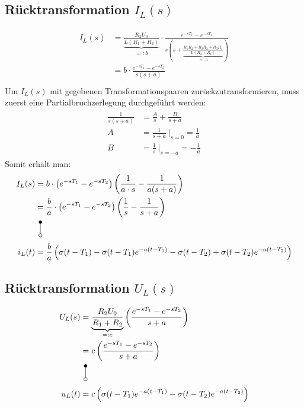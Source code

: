 \documentclass[11pt]{scrartcl}
\begin{document}
\subsection{Rücktransformation $I_{L}(s)$}
\begin{align}
  \begin{split}
    I_{L}(s) &= \underbrace{\frac{R_{2}U_{0}}{L(R_{1} + R_{2})}}_{=:b} \cdot \frac{e^{-sT_{1}} - e^{-sT_{2}}}{s\left( s + \underbrace{\frac{R_{1}R_{2} + R_{3}R_{2} + R_{3}R_{1}}{L(R_{2} + R_{1})}}_{=:a}\right)} \\
    &= b \cdot \frac{e^{-sT_{1}} - e^{-sT_{2}}}{s\left( s + a\right)} \\
  \end{split}
\end{align}
Um $I_{L}(s)$ mit gegebenen Transformationspaaren zurückzutransformieren, muss zuerst eine Partialbruchzerlegung durchgeführt werden:
\begin{align}
  \begin{split}
    \frac{1}{s(s+a)} &= \frac{A}{s} + \frac{B}{s+a} \\[20pt]
    A &= \frac{1}{s+a}\ \Bigg|_{s=0} = \frac{1}{a} \\
    B &= \frac{1}{s}\ \Bigg|_{s=-a} = -\frac{1}{a}
  \end{split}
\end{align}
Somit erhält man:
\begin{align}
  \begin{split}
    I_{L}(s) &= b \cdot \left(e^{-sT_{1}} - e^{-sT_{2}}\right) \left( \frac{1}{a\cdot s} - \frac{1}{a(s+a)}\right) \\
    &= \frac{b}{a} \cdot \left(e^{-sT_{1}} - e^{-sT_{2}}\right) \left( \frac{1}{s} - \frac{1}{s+a}\right) \\
    &\vlaplace \\
    i_{L}(t) &= \frac{b}{a}\left( \sigma(t-T_{1}) - \sigma(t-T_{1})e^{-a(t-T_{1})} - \sigma(t-T_{2}) + \sigma(t-T_{2})e^{-a(t-T_{2})}\right)
  \end{split}
\end{align}
\subsection{Rücktransformation $U_{L}(s)$}
\begin{align}
  \begin{split}
    U_{L}(s) &= \underbrace{\frac{R_{2}U_{0}}{R_{1} + R_{2}}}_{=:c}\left( \frac{e^{-sT_{1}} - e^{-sT_{2}}}{s + a}\right) \\
    &= c \left( \frac{e^{-sT_{1}} - e^{-sT_{2}}}{s + a}\right) \\
    &\vlaplace \\
    u_{L}(t) &= c \left( \sigma(t-T_{1}) e^{-a(t-T_{1})} - \sigma(t-T_{2})e^{-a(t-T_{2})}\right)
  \end{split}
\end{align}
\end{document}
